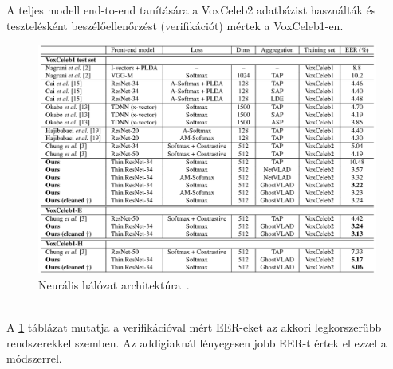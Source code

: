 A teljes modell end-to-end tanítására a VoxCeleb2 adatbázist használták és tesztelésként beszélőellenőrzést (verifikációt) mértek a VoxCeleb1-en.
\begin{figure}[!ht]
	\centering
	\includegraphics[width=150mm, keepaspectratio]{figures/frame-cnn-results.png}
	\caption{Neurális hálózat architektúra~\cite{speaker_in_the_wild}.}
	\label{fig:frame-cnn-results}
\end{figure}
\ \\
A \ref{fig:frame-cnn-results} táblázat mutatja a verifikációval mért EER-eket az akkori legkorszerűbb rendszerekkel szemben. Az addigiaknál lényegesen jobb EER-t értek el ezzel a módszerrel.


